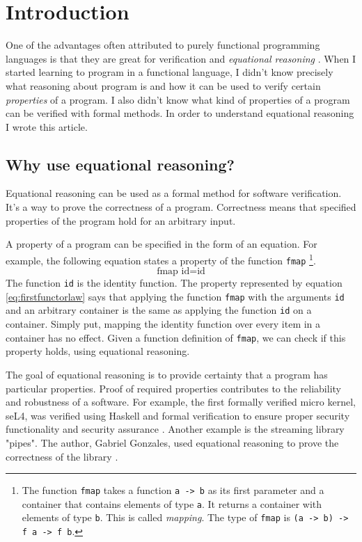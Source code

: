 \section{Introduction}
\label{sec:This}

One of the advantages often attributed to purely functional programming languages is that they are great for \gls{verification} and \emph{equational reasoning} \cite{Wadler87}.
When I started learning to program in a functional language, I didn't know precisely what reasoning about program is and how it can be used to verify certain \emph{properties} of a program. I also didn't know what kind of properties of a program can be verified with formal methods. In order to understand equational reasoning I wrote this article.

\subsection{Why use equational reasoning?}

Equational reasoning can be used as a formal method for software verification. It's a way to prove the correctness of a program. Correctness means that specified properties of the program hold for an arbitrary input. 

A property of a program can be specified in the form of an equation. For example, the following equation states a property of the function \verb|fmap|  \footnote{The function \verb|fmap| takes a function \verb|a -> b| as its first parameter and a container that contains elements of type \verb|a|. It returns a container with elements of type \verb|b|. This is called \emph{mapping}. The type of \verb|fmap| is \verb|(a -> b) -> f a -> f b|.}.
\begin{equation}
  \label{eq:firstfunctorlaw}
\text{fmap } \text{id}  =  \text{id}  
\end{equation}
 The function \verb|id| is the identity function. The property represented by equation \ref{eq:firstfunctorlaw} says that applying the function \verb|fmap| with the arguments \verb|id| and an arbitrary container is the same as applying the function \verb|id| on a container. Simply put, mapping the identity function over every item in a container has no effect. Given a function definition of \verb|fmap|, we can check if this property holds, using equational reasoning.

The goal of equational reasoning is to  provide certainty that a program has particular properties. Proof of required properties contributes to the reliability and robustness of a software. 
For example, the first formally verified micro kernel, seL4, was verified using Haskell and formal verification to ensure proper security functionality and security assurance \cite{Klein09}.
Another example is the streaming library "pipes". The author, Gabriel Gonzales, used equational reasoning to prove the correctness of the library \cite{gonzales13}.

